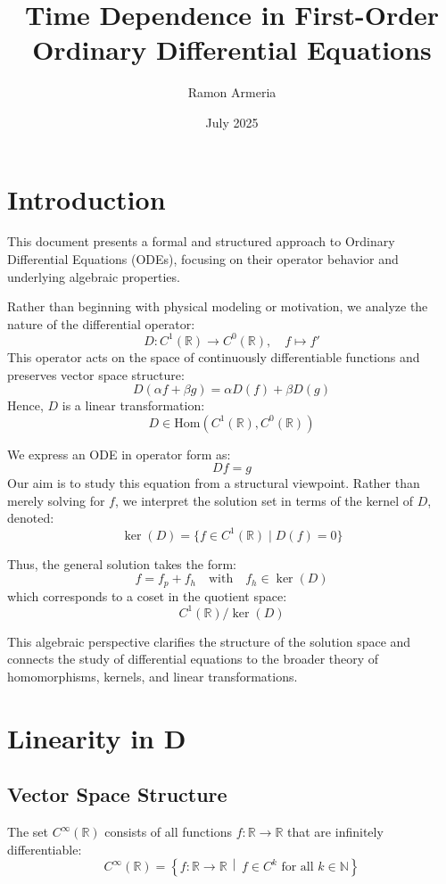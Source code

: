 \documentclass[12pt]{article}
\title{Time Dependence in First-Order Ordinary Differential Equations}
\author{Ramon Armeria}
\date{July 2025}
\begin{document}
	
	\maketitle
	
	
	\section*{Introduction}
	
	This document presents a formal and structured approach to Ordinary Differential Equations (ODEs), focusing on their operator behavior and underlying algebraic properties.
	
	Rather than beginning with physical modeling or motivation, we analyze the nature of the differential operator:
	$$
	D: C^1(\mathbb{R}) \to C^0(\mathbb{R}), \quad f \mapsto f'
	$$
	This operator acts on the space of continuously differentiable functions and preserves vector space structure:
	$$
	D(\alpha f + \beta g) = \alpha D(f) + \beta D(g)
	$$
	Hence, \( D \) is a linear transformation:
	$$
	D \in \mathrm{Hom}(C^1(\mathbb{R}), C^0(\mathbb{R}))
	$$
	
	We express an ODE in operator form as:
	$$
	Df = g
	$$
	Our aim is to study this equation from a structural viewpoint. Rather than merely solving for \( f \), we interpret the solution set in terms of the kernel of \( D \), denoted:
	$$
	\ker(D) = \{ f \in C^1(\mathbb{R}) \mid D(f) = 0 \}
	$$
	
	Thus, the general solution takes the form:
	$$
	f = f_p + f_h \quad \text{with} \quad f_h \in \ker(D)
	$$
	which corresponds to a coset in the quotient space:
	$$
	C^1(\mathbb{R}) \big/ \ker(D)
	$$
	
	This algebraic perspective clarifies the structure of the solution space and connects the study of differential equations to the broader theory of homomorphisms, kernels, and linear transformations.
	
	
	\section{Linearity in D}
	
	\subsection{Vector Space Structure}
	
	
	The set \( C^\infty(\mathbb{R}) \) consists of all functions \( f: \mathbb{R} \to \mathbb{R} \) that are infinitely differentiable:
	$$
	C^\infty(\mathbb{R}) = \left\{ f : \mathbb{R} \to \mathbb{R} \,\middle|\, f \in C^k \text{ for all } k \in \mathbb{N} \right\}
	$$
	
\end{document}
